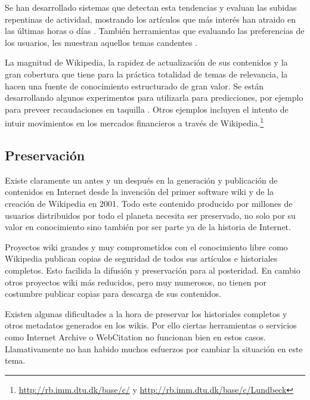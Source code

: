 \documentclass[11pt,onecolumn]{article}
\begin{document}
Se han desarrollado sistemas que detectan esta tendencias y evaluan las subidas repentinas de actividad, mostrando los artículos que más interés han atraido en las últimas horas o días \citep{osborne2012}. También herramientas que evaluando las preferencias de los usuarios, les muestran aquellos temas candentes \citep{ciglan2010}.


La magnitud de Wikipedia, la rapidez de actualización de sus contenidos y la gran cobertura que tiene para la práctica totalidad de temas de relevancia, la hacen una fuente de conocimiento estructurado de gran valor. Se están desarrollando algunos experimentos para utilizarla para predicciones, por ejemplo para preveer recaudaciones en taquilla \citep{mestyan2012}. Otros ejemplos incluyen el intento de intuir movimientos en los mercados financieros a través de Wikipedia.\footnote{\href{http://rb.imm.dtu.dk/base/c/}{http://rb.imm.dtu.dk/base/c/} y \href{http://rb.imm.dtu.dk/base/c/Lundbeck}{http://rb.imm.dtu.dk/base/c/Lundbeck}}

\subsection{Preservación}

Existe claramente un antes y un después en la generación y publicación de contenidos en Internet desde la invención del primer software wiki y de la creación de Wikipedia en 2001. Todo este contenido producido por millones de usuarios distribuidos por todo el planeta necesita ser preservado, no solo por su valor en conocimiento sino también por ser parte ya de la historia de Internet.

Proyectos wiki grandes y muy comprometidos con el conocimiento libre como Wikipedia publican copias de seguridad de todos sus artículos e historiales completos. Esto facilida la difusión y preservación para al posteridad. En cambio otros proyectos wiki más reducidos, pero muy numerosos, no tienen por costumbre publicar copias para descarga de sus contenidos.

Existen algunas dificultades a la hora de preservar los historiales completos y otros metadatos generados en los wikis. Por ello ciertas herramientas o servicios como Internet Archive o WebCitation no funcionan bien en estos casos. Llamativamente no han habido muchos esfuerzos por cambiar la situación en este tema.
\end{document}
